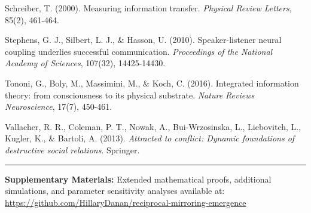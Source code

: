 \documentclass[12pt]{article}
\begin{document}
Schreiber, T. (2000). Measuring information transfer. \textit{Physical Review Letters}, 85(2), 461-464.

Stephens, G. J., Silbert, L. J., \& Hasson, U. (2010). Speaker-listener neural coupling underlies successful communication. \textit{Proceedings of the National Academy of Sciences}, 107(32), 14425-14430.

Tononi, G., Boly, M., Massimini, M., \& Koch, C. (2016). Integrated information theory: from consciousness to its physical substrate. \textit{Nature Reviews Neuroscience}, 17(7), 450-461.

Vallacher, R. R., Coleman, P. T., Nowak, A., Bui-Wrzosinska, L., Liebovitch, L., Kugler, K., \& Bartoli, A. (2013). \textit{Attracted to conflict: Dynamic foundations of destructive social relations}. Springer.

\vspace{1cm}
\noindent\rule{\textwidth}{0.5pt}

\textbf{Supplementary Materials:} Extended mathematical proofs, additional simulations, and parameter sensitivity analyses available at: \url{https://github.com/HillaryDanan/reciprocal-mirroring-emergence}
\end{document}
